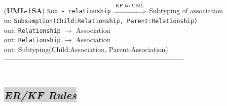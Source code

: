 \documentclass[sn-mathphys]{sn-jnl}
\begin{document}
{{({\bf UML-1SA}) {\tt Sub - relationship} $\overset{\text{KF to UML}}{\xLongrightarrow{\hspace*{1.4cm}}}$ {Subtyping of association}\\
\hspace*{0.3cm}in: {\tt Subsumption(Child:Relationship, Parent:Relationship)} \\
\hspace*{0.5cm}out:  {\tt Relationship} $\rightarrow$ {Association }\\
\hspace*{0.5cm}out:  {\tt Relationship} $\rightarrow$ {Association }\\
\hspace*{0.5cm}out:  {Subtyping(Child:Association, Parent:Association)}\\

------------------------------------------------------------------------------
\\ \






\subsection{\colorbox{lightgray}{\em ER/KF Rules}}

}}
\end{document}
